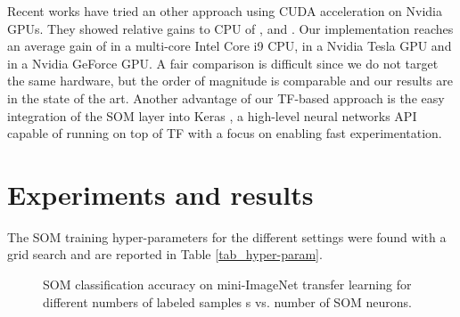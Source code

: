 \documentclass[runningheads]{llncs}
\begin{document}
Recent works have tried an other approach using CUDA acceleration on Nvidia GPUs. They showed relative gains to CPU of  \cite{moraes2012som_cuda},  \cite{gavval2019som_cuda} and  \cite{mcconnell2012som_opencl_cuda}. Our implementation reaches an average gain of  in a multi-core Intel Core i9 CPU,  in a Nvidia Tesla GPU and  in a Nvidia GeForce GPU. A fair comparison is difficult since we do not target the same hardware, but the order of magnitude is comparable and our results are in the state of the art.
Another advantage of our TF-based approach is the easy integration of the SOM layer into Keras \cite{chollet2015keras}, a high-level neural networks API capable of running on top of TF with a focus on enabling fast experimentation.



\section{Experiments and results}
\label{sec_results}
The SOM training hyper-parameters for the different settings were found with a grid search and are reported in Table \ref{tab_hyper-param}.

\begin{table}[ht]
\centering
\caption{SOM training hyper-parameters.}
\label{tab_hyper-param}
\begin{center}
\end{center}
\end{table}

\begin{figure}[h!]
	\centerline{}
	\caption{SOM classification accuracy on mini-ImageNet transfer learning for different numbers of labeled samples s vs. number of SOM neurons.}
	\label{fig_wrnsom-neurons}
\end{figure}
\end{document}
